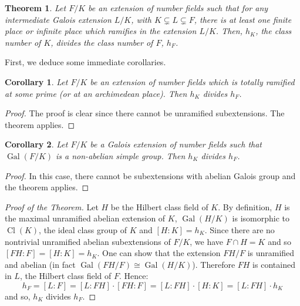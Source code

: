 \documentclass[12pt]{article}
\newtheorem{thm}{Theorem}
\newtheorem{cor}{Corollary}
\newcommand{\Gal}{\operatorname{Gal}}
\newcommand{\Cl}{\operatorname{Cl}}
\begin{document}
\begin{thm}
Let $F/K$ be an extension of number fields such that for any intermediate Galois extension $L/K$, with $K\subsetneq L \subsetneq F$, there is at least one finite place or infinite place which ramifies in the extension $L/K$. Then, $h_K$, the class number of $K$, divides the class number of $F$, $h_F$.
\end{thm}

First, we deduce some immediate corollaries.

\begin{cor}
Let $F/K$ be an extension of number fields which is totally ramified at some prime (or at an archimedean place). Then $h_K$ divides $h_F$. 
\end{cor}
\begin{proof}
The proof is clear since there cannot be unramified subextensions. The theorem applies.
\end{proof}

\begin{cor}
Let $F/K$ be a Galois extension of number fields such that $\Gal(F/K)$ is a non-abelian simple group. Then $h_K$ divides $h_F$.
\end{cor}
\begin{proof}
In this case, there cannot be subextensions with abelian Galois group and the theorem applies.
\end{proof}

\begin{proof}[Proof of the Theorem]
Let $H$ be the Hilbert class field of $K$. By definition, $H$ is the maximal unramified abelian extension of $K$, $\Gal(H/K)$ is isomorphic to $\Cl(K)$, the ideal class group of $K$ and $[H:K]=h_K$. Since there are no nontrivial unramified abelian subextensions of $F/K$, we have $F\cap H=K$ and so $[FH:F]=[H:K]=h_K$. One can show that the extension $FH/F$ is unramified and abelian (in fact $\Gal(FH/F)\cong \Gal(H/K)$). Therefore $FH$ is contained in $L$, the Hilbert class field of $F$. Hence:
$$h_F=[L:F]=[L:FH]\cdot[FH:F]=[L:FH]\cdot [H:K]=[L:FH]\cdot h_K$$
and so, $h_K$ divides $h_F$.
\end{proof}
\end{document}
